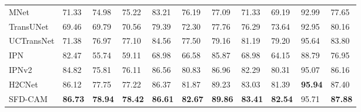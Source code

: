 \documentclass[times, review, 10pt]{elsarticle}
\begin{document}
\begin{CJK}{UTF8}{gbsn}
\begin{table}[htb]
\begin{tabular}{lllllllllll}
MNet                     & 71.33 & 74.98 & 75.22 & 83.21         & 76.19                               & 77.09 & 71.33 & 69.19 & 92.99         & 77.65\textbf{}                       \\
TransUNet                & 69.46 & 69.79 & 70.56 & 79.39         & 72.30                               & 77.76 & 76.29 & 73.64 & 92.95         & 80.16\textbf{}                       \\
UCTransNet               & 71.38 & 76.97 & 77.10 & 84.56         & 77.50                               & 79.16 & 81.19 & 79.20 & 95.64         & 83.80\textbf{}                       \\
IPN                      & 82.47 & 55.74 & 59.11 & 68.98         & 66.58                               & 85.87 & 68.98 & 64.15 & 88.79         & 76.95\textbf{}                       \\
IPNv2                    & 84.82 & 75.81 & 76.11 & 86.56         & 80.83                               & 86.96 & 82.29 & 80.31 & 95.07         & 86.16\textbf{}                       \\
H2CNet                   & 86.12 & 77.75 & 77.22 & 86.37         & 81.87                               & 89.23 & 83.03 & 81.39 & \textbf{95.94}         & 87.40\textbf{}                       \\
SFD-CAM                  & \textbf{86.73} & \textbf{78.94} & \textbf{78.42} & \textbf{86.61}         & \textbf{82.67}                               & \textbf{89.86} & \textbf{83.41} & \textbf{82.54} & 95.71         & \textbf{87.88}\textbf{}                       \\
\bottomrule
\end{tabular}%
\end{table}






\end{CJK}
\end{document}
